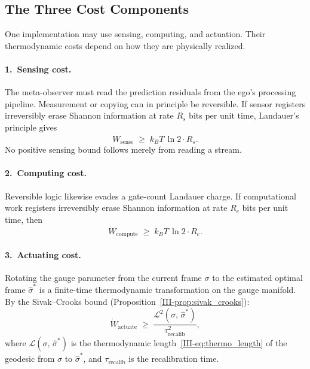 \documentclass[12pt,a4paper,openany]{book}
\begin{document}
\subsection{The Three Cost Components}
\label{III-subsec:cost_components}

One implementation may use sensing, computing, and actuation.  Their
thermodynamic costs depend on how they are physically realized.

\paragraph{1.\ Sensing cost.}
The meta-observer must read the prediction residuals from
the ego's processing pipeline.
Measurement or copying can in principle be reversible.  If sensor
registers irreversibly erase Shannon information at rate $R_s$ bits per unit time,
Landauer's principle gives
\begin{equation}
\label{III-eq:W_sense}
\dot{W}_{\mathrm{sense}}
\;\geq\; k_BT\,\ln 2 \cdot R_s.
\end{equation}
No positive sensing bound follows merely from reading a stream.

\paragraph{2.\ Computing cost.}
Reversible logic likewise evades a gate-count Landauer charge.  If
computational work registers irreversibly erase Shannon information at rate $R_c$ bits
per unit time, then
\begin{equation}
\label{III-eq:W_compute}
\dot{W}_{\mathrm{compute}}
\;\geq\; k_BT\,\ln 2 \cdot R_c.
\end{equation}

\paragraph{3.\ Actuating cost.}
Rotating the gauge parameter from the current frame
$\sigma$ to the estimated optimal frame
$\hat{\sigma}^*$ is a finite-time thermodynamic
transformation on the gauge manifold.
By the Sivak--Crooks bound
(Proposition~\ref{III-prop:sivak_crooks}):
\begin{equation}
\label{III-eq:W_actuate}
\dot{W}_{\mathrm{actuate}}
\;\geq\; \frac{\mathcal{L}^2(\sigma,\,\hat{\sigma}^*)}
  {\tau_{\mathrm{recalib}}^2},
\end{equation}
where $\mathcal{L}(\sigma,\,\hat{\sigma}^*)$ is the
thermodynamic length~\eqref{III-eq:thermo_length} of the
geodesic from $\sigma$ to $\hat{\sigma}^*$, and
$\tau_{\mathrm{recalib}}$ is the recalibration time.
\end{document}
